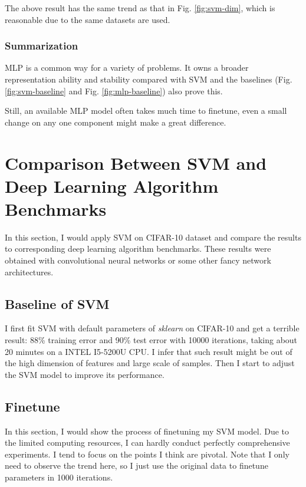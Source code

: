 \documentclass[12pt,a4paper]{article}
\theoremstyle{definition}
\begin{document}
The above result has the same trend as that in Fig. \ref{fig:svm-dim}, which is reasonable due to the same datasets are used.

\subsubsection{Summarization}
\label{sec:sum-mlp}

MLP is a common way for a variety of problems. It owns a broader representation ability and stability compared with SVM and the baselines (Fig. \ref{fig:svm-baseline} and Fig. \ref{fig:mlp-baseline}) also prove this.

\vspace{0.01\linewidth}
Still, an available MLP model often takes much time to finetune, even a small change on any one component might make a great difference.

\section{Comparison Between SVM and Deep Learning Algorithm Benchmarks}

In this section, I would apply SVM on CIFAR-10 dataset \cite{cifar-10} and compare the results to corresponding deep learning algorithm benchmarks. These results were obtained with convolutional neural networks or some other fancy network architectures.

\subsection{Baseline of SVM}
\vspace{0.01\linewidth}

I first fit SVM with default parameters of \textit{sklearn} on CIFAR-10 and get a terrible result: 88\% training error and 90\% test error with 10000 iterations, taking about 20 minutes on a INTEL I5-5200U CPU. I infer that such result might be out of the high dimension of features and large scale of samples. Then I start to adjust the SVM model to improve its performance.

\subsection{Finetune}
\label{sec:finetune}

In this section, I would show the process of finetuning my SVM model. Due to the limited computing resources, I can hardly conduct perfectly comprehensive experiments. I tend to focus on the points I think are pivotal. Note that I only need to observe the trend here, so I just use the original data to finetune parameters in 1000 iterations.
\end{document}
